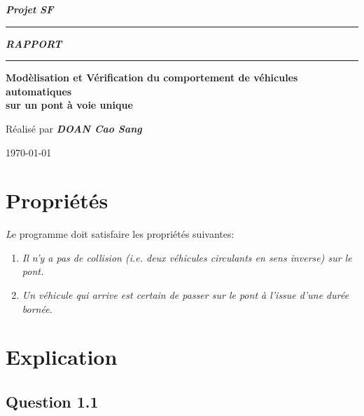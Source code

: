 \documentclass[a4paper,11pt]{report}
\begin{document}
	\begin{titlepage}
		\begin{center}
			\large\bfseries\itshape Projet SF\\
		\end{center}
		\noindent\rule{\linewidth}{3pt}

		\begin{center}
			\Huge\bfseries\itshape RAPPORT\\
		\end{center}
		
		\noindent\rule{\linewidth}{3pt}
		\begin{center}
			\bfseries
			\large Modèlisation et Vérification du comportement de véhicules automatiques\\sur un pont à voie unique
			
		\end{center}
		\begin{center}
			Réalisé par \bfseries \itshape DOAN Cao Sang
		\end{center}
		\begin{center}
			\today
		\end{center}
	\end{titlepage}

\chapter{Propriétés}
	{\huge \itshape L}e programme doit satisfaire les propriétés suivantes:
		\begin{enumerate}
			\item \textit{Il n'y a pas de collision (i.e. deux véhicules circulants en sens inverse) sur le pont.}
			\item \textit{Un véhicule qui arrive est certain de passer sur le pont à l'issue d'une durée bornée.}
		\end{enumerate}
	
\chapter{Explication}
\section{Question 1.1}
\end{document}
